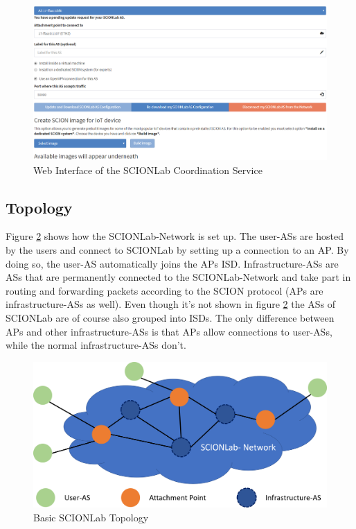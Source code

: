 \begin{figure}[h]
	\centering
	\includegraphics[width=\textwidth]{img/SCIONLab_Coordination_Service.png}
	\caption{Web Interface of the SCIONLab Coordination Service }
	\label{SCIONLab Coordination Service}
\end{figure}

\newpage

\subsection{Topology}
Figure \ref{Basic SCIONLab Topology} shows how the \acs{SCIONLab}-Network is set up. The user-\acsp{AS} are hosted by the users and connect to \acs{SCIONLab} by setting up a connection to an \acs{AP}. By doing so, the user-\acs{AS} automatically joins the \acl{AP}s \acs{ISD}. Infrastructure-\acsp{AS} are \acsp{AS} that are permanently connected to the \acs{SCIONLab}-Network and take part in routing and forwarding packets according to the \acs{SCION} protocol (\acsp{AP} are infrastructure-\acsp{AS} as well). Even though it's not shown in figure \ref{Basic SCIONLab Topology} the \acsp{AS} of \acs{SCIONLab} are of course also grouped into \acsp{ISD}. The only difference between \aclp{AP} and other infrastructure-\acsp{AS} is that \acsp{AP} allow connections to user-\acsp{AS}, while the normal infrastructure-\acsp{AS} don't.

\begin{figure}[h]
	\centering
	\includegraphics[width =\textwidth]{img/SCIONLab-Topology.png}
	\caption{Basic SCIONLab Topology}
	\label{Basic SCIONLab Topology}
\end{figure}
